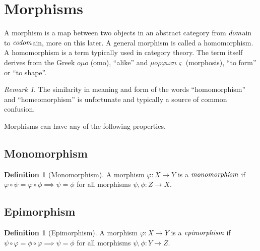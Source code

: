 \documentclass[10pt, oneside, reqno]{amsart}
\theoremstyle{plain}%
\theoremstyle{definition}
\newtheorem{defn}[thm]{Definition}
\theoremstyle{remark}
\newtheorem*{rem}{Remark}
\begin{document}
\section{Morphisms} %
\label{sec:morphisms}
A morphism is a map between two objects in an abstract category from $\emph{dom}$ain to $\emph{codom}$ain, more on this later.
A general morphism is called a homomorphism. A homomorphism is a term typically used in category theory.
The term itself derives from the Greek $o \mu o$ (omo), ``alike'' and $\mu o \rho\varphi\omega\sigma\iota\varsigma$
(morphosis), ``to form'' or ``to shape''.
\begin{rem}
 The similarity in meaning and form of the words ``homomorphism'' and ``homeomorphism'' is unfortunate and typically
 a source of common confusion.
\end{rem}

Morphisms can have any of the following properties.

\subsection{Monomorphism} %
\label{subsec:monomorphism}
\begin{defn}[Monomorphism]
 A morphism $\varphi: X \to Y$ is a $\emph{monomorphism}$ if $\varphi \circ \psi = \varphi \circ \phi \implies \psi = \phi$ for all morphisms $\psi,\phi: Z \to X$.
 \\
 \end{defn}

\subsection{Epimorphism} %
\label{subsec:epimorphism}
\begin{defn}[Epimorphism]
 A morphism $\varphi: X \to Y$ is a $\emph{epimorphism}$ if $\psi \circ \varphi = \phi \circ \varphi \implies \psi = \phi$ for all morphisms $\psi,\phi: Y \to Z$.
 \\
\end{defn}
 
\end{document}
